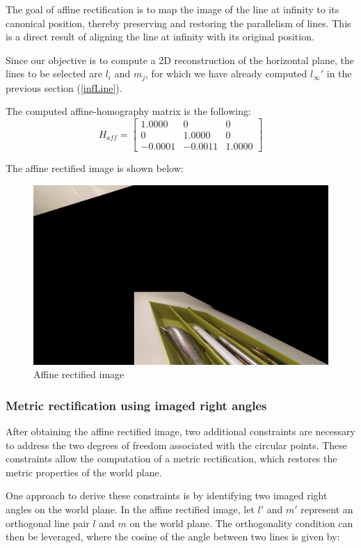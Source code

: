 The goal of affine rectification is to map the image of the line at infinity to its canonical position, thereby preserving and restoring the parallelism of lines. This is a direct result of aligning the line at infinity with its original position.

Since our objective is to compute a 2D reconstruction of the horizontal plane, the lines to be selected are $l_i$ and $m_j$, for which we have already computed $l_{\infty}'$ in the previous section (\ref{infLine}).

The computed affine-homography matrix is the following:
\[
    H_{aff}
    =
    \begin{bmatrix}
        1.0000 & 0 & 0 \\
        0 & 1.0000 & 0 \\
        -0.0001 & -0.0011 & 1.0000
    \end{bmatrix}
\]

The affine rectified image is shown below:
\begin{figure}[H]
    \centering
    \includegraphics[width=0.75\linewidth]{img/affineRectifiedImage.jpg}
    \caption{Affine rectified image}
    \label{fig:affineRectification}
\end{figure}

\subsubsection{Metric rectification using imaged right angles}
After obtaining the affine rectified image, two additional constraints are necessary to address the two degrees of freedom associated with the circular points. These constraints allow the computation of a metric rectification, which restores the metric properties of the world plane.

One approach to derive these constraints is by identifying two imaged right angles on the world plane. In the affine rectified image, let $l'$ and $m'$ represent an orthogonal line pair $l$ and $m$ on the world plane. The orthogonality condition can then be leveraged, where the cosine of the angle between two lines is given by:


